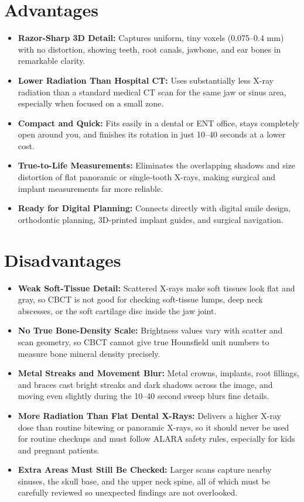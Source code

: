 \section{Advantages}
\begin{itemize}
    \item \textbf{Razor-Sharp 3D Detail:} Captures uniform, tiny voxels (0.075--0.4 mm) with no distortion, showing teeth, root canals, jawbone, and ear bones in remarkable clarity.
    \item \textbf{Lower Radiation Than Hospital CT:} Uses substantially less X-ray radiation than a standard medical CT scan for the same jaw or sinus area, especially when focused on a small zone.
    \item \textbf{Compact and Quick:} Fits easily in a dental or ENT office, stays completely open around you, and finishes its rotation in just 10--40 seconds at a lower cost.
    \item \textbf{True-to-Life Measurements:} Eliminates the overlapping shadows and size distortion of flat panoramic or single-tooth X-rays, making surgical and implant measurements far more reliable.
    \item \textbf{Ready for Digital Planning:} Connects directly with digital smile design, orthodontic planning, 3D-printed implant guides, and surgical navigation.
\end{itemize}

\section{Disadvantages}
\begin{itemize}
    \item \textbf{Weak Soft-Tissue Detail:} Scattered X-rays make soft tissues look flat and gray, so CBCT is not good for checking soft-tissue lumps, deep neck abscesses, or the soft cartilage disc inside the jaw joint.
    \item \textbf{No True Bone-Density Scale:} Brightness values vary with scatter and scan geometry, so CBCT cannot give true Hounsfield unit numbers to measure bone mineral density precisely.
    \item \textbf{Metal Streaks and Movement Blur:} Metal crowns, implants, root fillings, and braces cast bright streaks and dark shadows across the image, and moving even slightly during the 10--40 second sweep blurs fine details.
    \item \textbf{More Radiation Than Flat Dental X-Rays:} Delivers a higher X-ray dose than routine bitewing or panoramic X-rays, so it should never be used for routine checkups and must follow ALARA safety rules, especially for kids and pregnant patients.
    \item \textbf{Extra Areas Must Still Be Checked:} Larger scans capture nearby sinuses, the skull base, and the upper neck spine, all of which must be carefully reviewed so unexpected findings are not overlooked.
\end{itemize}

